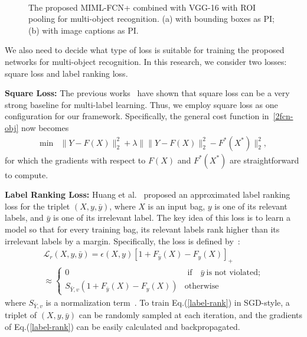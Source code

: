 \documentclass[10pt,twocolumn,letterpaper]{article}
\begin{document}
\begin{figure}
	\centering
	\\
	\caption{The proposed \textsc{MIML-FCN+} combined with VGG-16 with ROI pooling for multi-object recognition. (a) with bounding boxes as PI; (b) with image captions as PI.}
	\label{pi}
\end{figure}

We also need to decide what type of loss is suitable for training
the proposed networks for multi-object recognition. In this
research, we consider two losses: square loss and label ranking
loss.

\textbf{Square Loss:} The previous works~\cite{Wei2014,Yang2016a}
have shown that square loss can be a very strong baseline for
multi-label learning. Thus, we employ square loss as one
configuration for our framework. Specifically, the general cost
function in~\eqref{2fcn-obj} now becomes
\begin{equation}
\label{square}
\begin{matrix}
\min & \|Y -F(X)\|_2^2 + \lambda\|\|Y -F(X)\|_2^2 -
F^*(X^*)\|_2^2,
\end{matrix}
\end{equation}
for which the gradients with respect to $F(X)$ and $F^*(X^*)$ are
straightforward to compute.

\textbf{Label Ranking Loss:} Huang et al.~\cite{Huang2014}
proposed an approximated label ranking loss for the triplet
$(X,y,\bar{y})$, where $X$ is an input bag, $y$ is one of its
relevant labels, and $\bar{y}$ is one of its irrelevant label. The
key idea of this loss is to learn a model so that for every
training bag, its relevant labels rank higher than its irrelevant
labels by a margin. Specifically, the loss is defined
by~\cite{Huang2014}:
\begin{multline}
\label{label-rank}
\mathcal{L}_{r}(X,y,\bar{y}) = \epsilon(X,y)\left[1+F_{\bar{y}}(X)-F_y(X) \right]_+ \\
\approx\begin{cases}
0 & \text{ if { }}  \bar{y} \ \text{is not violated;}\\
S_{\bar{Y},v}(1+F_{\bar{y}}(X)-F_y(X)) &\text{otherwise}
\end{cases}
\end{multline}
where $S_{\bar{Y},v}$ is a normalization term~\cite{Huang2014}. To
train Eq.(\ref{label-rank}) in SGD-style, a triplet of
$(X,y,\bar{y})$ can be randomly sampled at  each iteration, and
the gradients of Eq.(\ref{label-rank}) can be easily calculated
and backpropagated.
\end{document}
